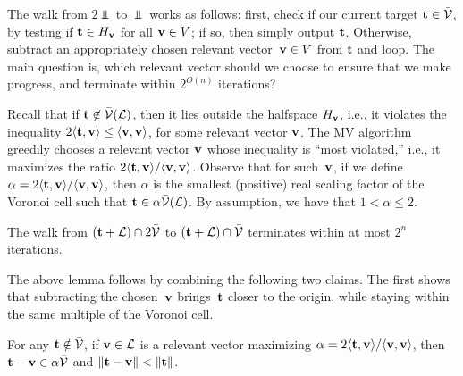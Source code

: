 \documentclass[11pt]{article}
\begin{document}
The walk from $2 \Vbar$ to $\Vbar$ works as follows: first, check if
our current target $\mathbf{t} \in \bar{\mathcal{V}}$, by testing if
$\mathbf{t} \in H_{\mathbf{v}}$ for all $\mathbf{v} \in V$; if so, then simply output
$\mathbf{t}$. Otherwise, subtract an appropriately chosen relevant
vector~$\mathbf{v} \in V$ from $\mathbf{t}$ and loop. The main question is,
which relevant vector should we choose to ensure that we make
progress, and terminate within $2^{O(n)}$ iterations?

Recall that if $\mathbf{t} \not\in \bar{\mathcal{V}}(\mathcal{L})$, then it lies outside the
halfspace $H_{\mathbf{v}}$, i.e., it violates the inequality
$2\langle\mathbf{t}, \mathbf{v}\rangle \leq \langle\mathbf{v}, \mathbf{v}\rangle$, for some relevant
vector $\mathbf{v}$. The MV algorithm greedily chooses a relevant vector
$\mathbf{v}$ whose inequality is ``most violated,'' i.e., it maximizes the
ratio $2 \langle\mathbf{t}, \mathbf{v}\rangle/\langle\mathbf{v}, \mathbf{v}\rangle$. Observe that for
such~$\mathbf{v}$, if we define
$\alpha = 2\langle\mathbf{t}, \mathbf{v}\rangle/\langle\mathbf{v},\mathbf{v}\rangle$, then $\alpha$ is
the smallest (positive) real scaling factor of the Voronoi cell such
that $\mathbf{t} \in \alpha \bar{\mathcal{V}}(\mathcal{L})$. By assumption, we have that
$1 < \alpha \leq 2$.

\begin{lemma}
  \label{lem:MV-steps}
  The walk from $(\mathbf{t}+\mathcal{L}) \cap 2\bar{\mathcal{V}}$ to
  $(\mathbf{t}+\mathcal{L}) \cap \bar{\mathcal{V}}$ terminates within at most $2^{n}$
  iterations.
\end{lemma}

The above lemma follows by combining the following two claims. The
first shows that subtracting the chosen~$\mathbf{v}$ brings~$\mathbf{t}$ closer
to the origin, while staying within the same multiple of the Voronoi
cell.

\begin{claim}
  \label{clm:MV-progress}
  For any $\mathbf{t} \notin \bar{\mathcal{V}}$, if $\mathbf{v} \in \mathcal{L}$ is a relevant
  vector maximizing
  $\alpha = 2 \langle\mathbf{t}, \mathbf{v}\rangle/\langle\mathbf{v}, \mathbf{v}\rangle$, then
  $\mathbf{t} - \mathbf{v} \in \alpha \bar{\mathcal{V}}$ and
  $\lVert\mathbf{t} - \mathbf{v}\rVert < \lVert\mathbf{t}\rVert$.
\end{claim}
\end{document}
